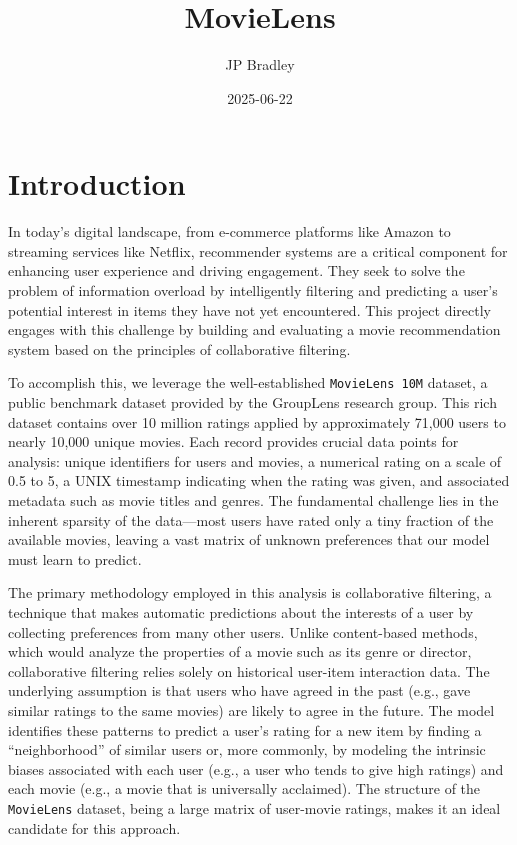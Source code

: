 \documentclass[
]{article}
\title{MovieLens}
\author{JP Bradley}
\date{2025-06-22}
\begin{document}
\maketitle

\section{Introduction}\label{introduction}

In today's digital landscape, from e-commerce platforms like Amazon to
streaming services like Netflix, recommender systems are a critical
component for enhancing user experience and driving engagement. They
seek to solve the problem of information overload by intelligently
filtering and predicting a user's potential interest in items they have
not yet encountered. This project directly engages with this challenge
by building and evaluating a movie recommendation system based on the
principles of collaborative filtering.

To accomplish this, we leverage the well-established
\texttt{MovieLens\ 10M} dataset, a public benchmark dataset provided by
the GroupLens research group. This rich dataset contains over 10 million
ratings applied by approximately 71,000 users to nearly 10,000 unique
movies. Each record provides crucial data points for analysis: unique
identifiers for users and movies, a numerical rating on a scale of 0.5
to 5, a UNIX timestamp indicating when the rating was given, and
associated metadata such as movie titles and genres. The fundamental
challenge lies in the inherent sparsity of the data---most users have
rated only a tiny fraction of the available movies, leaving a vast
matrix of unknown preferences that our model must learn to predict.

The primary methodology employed in this analysis is collaborative
filtering, a technique that makes automatic predictions about the
interests of a user by collecting preferences from many other users.
Unlike content-based methods, which would analyze the properties of a
movie such as its genre or director, collaborative filtering relies
solely on historical user-item interaction data. The underlying
assumption is that users who have agreed in the past (e.g., gave similar
ratings to the same movies) are likely to agree in the future. The model
identifies these patterns to predict a user's rating for a new item by
finding a ``neighborhood'' of similar users or, more commonly, by
modeling the intrinsic biases associated with each user (e.g., a user
who tends to give high ratings) and each movie (e.g., a movie that is
universally acclaimed). The structure of the \texttt{MovieLens} dataset,
being a large matrix of user-movie ratings, makes it an ideal candidate
for this approach.
\end{document}
